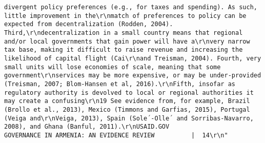 \documentclass[
]{article}
\begin{document}
\begin{verbatim}
divergent policy preferences (e.g., for taxes and spending). As such, little improvement in the\r\nmatch of preferences to policy can be expected from decentralization (Rodden, 2004). Third,\r\ndecentralization in a small country means that regional and/or local governments that gain power will have a\r\nvery narrow tax base, making it difficult to raise revenue and increasing the likelihood of capital flight (Cai\r\nand Treisman, 2004). Fourth, very small units will lose economies of scale, meaning that some government\r\nservices may be more expensive, or may be under-provided (Treisman, 2007; Blom-Hansen et al, 2016).\r\nFifth, insofar as regulatory authority is devolved to local or regional authorities it may create a confusing\r\n19 See evidence from, for example, Brazil (Brollo et al., 2013), Mexico (Timmons and Garfias, 2015), Portugal (Veiga and\r\nVeiga, 2013), Spain (Sole´-Olle´ and Sorribas-Navarro, 2008), and Ghana (Banful, 2011).\r\nUSAID.GOV                                                          GOVERNANCE IN ARMENIA: AN EVIDENCE REVIEW          |  14\r\n"                                                                                                                                                                                                                                                                                                                                                                                                                                                                                                                                                                                                                                                             

\end{verbatim}
\end{document}

